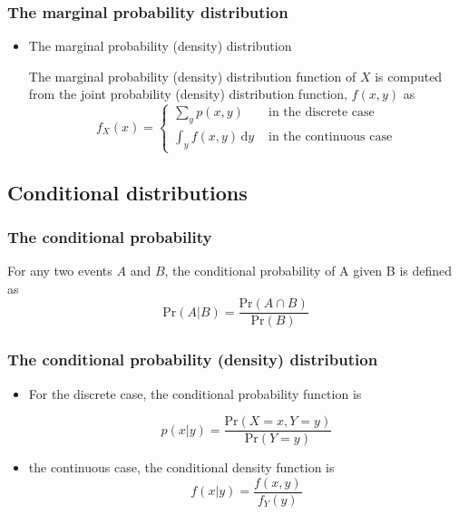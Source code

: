 \documentclass[a4paper,11pt]{article}
\newcommand{\dx}{\mathrm{d}}
\begin{document}
\subsubsection*{The marginal probability distribution}
\label{sec:org5a54bcd}
\begin{itemize}
\item The marginal probability (density) distribution
\label{sec:orga043683}

The marginal probability (density) distribution function of \(X\) is
computed from the joint probability (density) distribution function,
\(f(x, y)\) as
\begin{equation*}
f_{X}(x) =
\begin{cases}
\sum_{y} p(x, y) & \text{ in the discrete case} \\
\int_{y} f(x, y)\, \dx y & \text{ in the continuous case}
\end{cases}
\end{equation*}
\end{itemize}

\subsection{Conditional distributions}
\label{sec:org8333729}
\subsubsection*{The conditional probability}
\label{sec:org2732b80}
For any two events \(A\) and \(B\), the conditional probability of A given
B is defined as
\[ \mathrm{Pr}(A|B) = \frac{\mathrm{Pr}(A \cap B )}{\mathrm{Pr}(B)}\]
\subsubsection*{The conditional probability (density) distribution}
\label{sec:org4b26d92}
\begin{itemize}
\item For the discrete case, the conditional probability function is
\label{sec:org8f6e45d}

\[ p(x|y) = \frac{\mathrm{Pr}(X=x, Y=y)}{\mathrm{Pr}(Y=y)}\]

\item the continuous case, the conditional density function is
\label{sec:org6b5c5b5}
\[ f(x|y) = \frac{f(x, y)}{f_{Y}(y)}\]
\end{itemize}
\end{document}
